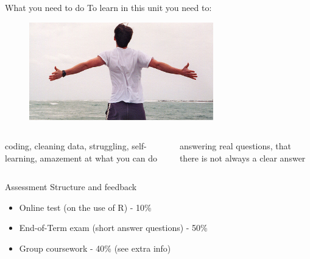 \documentclass[
  ignorenonframetext,
]{beamer}
\begin{document}
\begin{frame}{What you need to do}
\label{what-you-need-to-do}
To learn in this unit you need to:

\begin{figure}
    \centering
    \includegraphics[width=8cm]{Embrace.jpg}\\
\end{figure}

\hfill\break

\begin{columns}
  \begin{column}{0.5\textwidth}
    \textcolor{student}{coding, cleaning data, struggling, self-learning, amazement at what you can do}
  \end{column}
  \begin{column}{0.5\textwidth}
    \textcolor{student}{answering real questions, that there is not always a clear answer}
  \end{column}
    
\end{columns}
\end{frame}

\begin{frame}{Assessment Structure and feedback}
\label{assessment-structure-and-feedback}
\begin{itemize}
  \item Online test (on the use of R) - 10\%
  \item End-of-Term exam (short answer questions) - 50\%
  \item Group coursework - 40\% (see extra info)

\end{itemize}
\end{frame}
\end{document}
